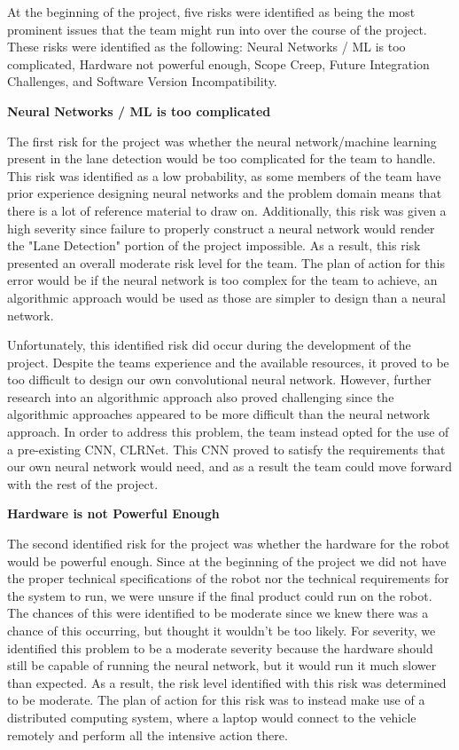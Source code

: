 \documentclass[titlepage,draft]{article}
\begin{document}
At the beginning of the project, five risks were identified as being the most prominent issues that the team might run into over the course of the project. These risks were identified as the following: Neural Networks / ML is too complicated, Hardware not powerful enough, Scope Creep, Future Integration Challenges, and Software Version Incompatibility.

\textbf{Neural Networks / ML is too complicated}

The first risk for the project was whether the neural network/machine learning present in the lane detection would be too complicated for the team to handle. This risk was identified as a low probability, as some members of the team have prior experience designing neural networks and the problem domain means that there is a lot of reference material to draw on. Additionally, this risk was given a high severity since failure to properly construct a neural network would render the "Lane Detection" portion of the project impossible. As a result, this risk presented an overall moderate risk level for the team. The plan of action for this error would be if the neural network is too complex for the team to achieve, an algorithmic approach would be used as those are simpler to design than a neural network.

Unfortunately, this identified risk did occur during the development of the project. Despite the teams experience and the available resources, it proved to be too difficult to design our own convolutional neural network. However, further research into an algorithmic approach also proved challenging since the algorithmic approaches appeared to be more difficult than the neural network approach. In order to address this problem, the team instead opted for the use of a pre-existing CNN, CLRNet. This CNN proved to satisfy the requirements that our own neural network would need, and as a result the team could move forward with the rest of the project.

\textbf{Hardware is not Powerful Enough}

The second identified risk for the project was whether the hardware for the robot would be powerful enough. Since at the beginning of the project we did not have the proper technical specifications of the robot nor the technical requirements for the system to run, we were unsure if the final product could run on the robot. The chances of this were identified to be moderate since we knew there was a chance of this occurring, but thought it wouldn't be too likely. For severity, we identified this problem to be a moderate severity because the hardware should still be capable of running the neural network, but it would run it much slower than expected. As a result, the risk level identified with this risk was determined to be moderate. The plan of action for this risk was to instead make use of a distributed computing system, where a laptop would connect to the vehicle remotely and perform all the intensive action there.
\end{document}
